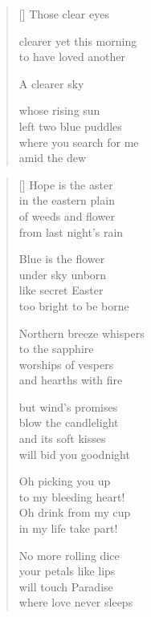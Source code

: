 \documentclass[12pt,a4paper]{article}
\begin{document}

\newpage

\poemtitle{}

\settowidth{\versewidth}{where you search for me}

\bigskip

\begin{verse}[\versewidth]
  Those clear eyes

  clearer yet this morning \\
  to have loved another

  A clearer sky

  whose rising sun \\
  left two blue puddles \\
  where you search for me \\
  amid the dew
\end{verse}


\newpage

\poemtitle{}

\settowidth{\versewidth}{Northern breeze whispers}

\bigskip

\begin{verse}[\versewidth]
  Hope is the aster \\
  in the eastern plain \\
  of weeds and flower \\
  from last night's rain

  Blue is the flower \\
  under sky unborn \\
  like secret Easter \\
  too bright to be borne

  Northern breeze whispers \\
  to the sapphire \\
  worships of vespers \\
  and hearths with fire

  but wind's promises \\
  blow the candlelight \\
  and its soft kisses \\
  will bid you goodnight

  Oh picking you up \\
  to my bleeding heart! \\
  Oh drink from my cup \\
  in my life take part!

  No more rolling dice \\
  your petals like lips \\
  will touch Paradise \\
  where love never sleeps
\end{verse}
\end{document}
